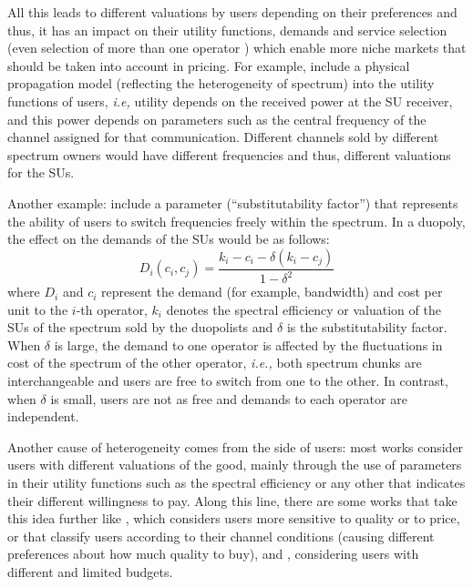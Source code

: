 All this leads to different valuations by users depending on their preferences and thus, it has an impact on their utility functions, demands and service selection (even selection of more than one operator \cite{ref:Jia2008}) which enable more niche markets that should be taken into account in pricing. For example, \cite{ref:Xing2007,ref:Min2011,ref:Dixit2010} include a physical propagation model (reflecting the heterogeneity of spectrum) into the utility functions of users, \textit{i.e,} utility depends on the received power at the SU receiver, and this power depends on parameters such as the central frequency of the channel assigned for that communication. Different channels sold by different spectrum owners would have different frequencies and thus, different valuations for the SUs.

Another example: \cite{ref:Niyato2008_Comp,ref:Niyato2007_Eq} include a parameter (``substitutability factor'') that represents the ability of users to switch frequencies freely within the spectrum. In a duopoly, the effect on the demands of the SUs would be as follows: 
\begin{equation}
D_i (c_i,c_j) = \frac{k_i - c_i - \delta(k_i - c_j)}{1 - \delta^2}
\end{equation}
where $D_i$ and $c_i$ represent the demand (for example, bandwidth) and cost per unit to the $i$-th operator, $k_i$ denotes the spectral efficiency or valuation of the SUs of the spectrum sold by the duopolists and $\delta$ is the substitutability factor. When $\delta$ is large, the demand to one operator is affected by the fluctuations in cost of the spectrum of the other operator, \textit{i.e.,} both spectrum chunks are interchangeable and users are free to switch from one to the other. In contrast, when $\delta$ is small, users are not as free and demands to each operator are independent. 

Another cause of heterogeneity comes from the side of users: most works consider users with different valuations of the good, mainly through the use of parameters in their utility functions such as the spectral efficiency or any other that indicates their different willingness to pay. Along this line, there are some works that take this idea further like \cite{ref:Xing2007}, which considers users more sensitive to quality or to price, or \cite{ref:Gao2011,ref:Duan2011_Contract} that classify users according to their channel conditions (causing different preferences about how much quality to buy), and \cite{ref:Yang2011,ref:Xing2007}, considering users with different and limited budgets.

